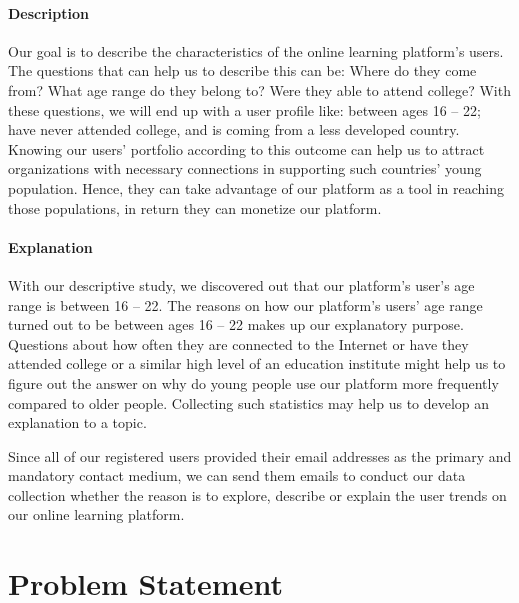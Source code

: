 \paragraph{Description}
Our goal is to describe the characteristics of the online learning platform's users. The questions that can help us to describe this can be: Where do they come from? What age range do they belong to? Were they able to attend college? With these questions, we will end up with a user profile like: between ages 16 -- 22; have never attended college, and is coming from a less developed country. Knowing our users' portfolio according to this outcome can help us to attract organizations with necessary connections in supporting such countries' young population. Hence, they can take advantage of our platform as a tool in reaching those populations, in return they can monetize our platform.

\paragraph{Explanation}
With our descriptive study, we discovered out that our platform's user's age range is between 16 -- 22. The reasons on how our platform's users' age range turned out to be between ages 16 -- 22 makes up our explanatory purpose. Questions about how often they are connected to the Internet or have they attended college or a similar high level of an education institute might help us to figure out the answer on why do young people use our platform more frequently compared to older people. Collecting such statistics may help us to develop an explanation to a topic.

\vspace{1cm}
Since all of our registered users provided their email addresses as the primary and mandatory contact medium, we can send them emails to conduct our data collection whether the reason is to explore, describe or explain the user trends on our online learning platform.

\section{Problem Statement}
\label{sec:2:Problem}

